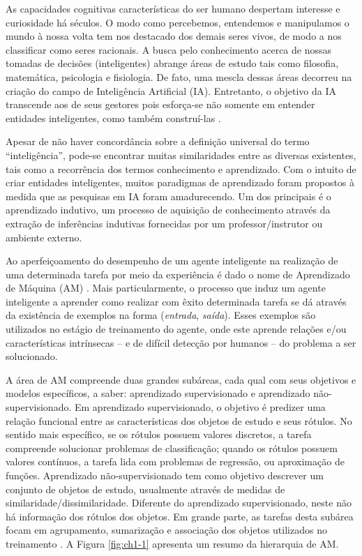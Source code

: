 As capacidades cognitivas características do ser humano despertam interesse e curiosidade há séculos. O modo como percebemos, entendemos e manipulamos o mundo à nossa volta tem nos destacado dos demais seres vivos, de modo a nos classificar como seres racionais. A busca pelo conhecimento acerca de nossas tomadas de decisões (inteligentes) abrange áreas de estudo tais como filosofia, matemática, psicologia e fisiologia. De fato, uma mescla dessas áreas decorreu na criação do campo de Inteligência Artificial (IA). Entretanto, o objetivo da IA transcende aos de seus gestores pois esforça-se não somente em entender entidades inteligentes, como também construí-las \cite{russell2009}.

Apesar de não haver concordância sobre a definição universal do termo ``inteligência'', pode-se encontrar muitas similaridades entre as diversas existentes, tais como a recorrência dos termos conhecimento e aprendizado. Com o intuito de criar entidades inteligentes, muitos paradigmas de aprendizado foram propostos à medida que as pesquisas em IA foram amadurecendo. Um dos principais é o aprendizado indutivo, um processo de aquisição de conhecimento através da extração de inferências indutivas fornecidas por um professor/instrutor ou ambiente externo.

Ao aperfeiçoamento do desempenho de um agente inteligente na realização de uma determinada tarefa por meio da experiência é dado o nome de Aprendizado de Máquina (AM) \cite{mitchell1997}. Mais particularmente, o processo que induz um agente inteligente a aprender como realizar com êxito determinada tarefa se dá através da existência de exemplos na forma (\textit{entrada}, \textit{saída}). Esses exemplos são utilizados no estágio de treinamento do agente, onde este aprende relações e/ou características intrínsecas -- e de difícil detecção por humanos -- do problema a ser solucionado.

A área de AM compreende duas grandes subáreas, cada qual com seus objetivos e modelos específicos, a saber: aprendizado supervisionado e aprendizado não-supervisionado. Em aprendizado supervisionado, o objetivo é predizer uma relação funcional entre as características dos objetos de estudo e seus rótulos. No sentido mais específico, se os rótulos possuem valores discretos, a tarefa compreende solucionar problemas de classificação; quando os rótulos possuem valores contínuos, a tarefa lida com problemas de regressão, ou aproximação de funções. Aprendizado não-supervisionado tem como objetivo descrever um conjunto de objetos de estudo, usualmente através de medidas de similaridade/dissimilaridade. Diferente do aprendizado supervisionado, neste não há informação dos rótulos dos objetos. Em grande parte, as tarefas desta subárea focam em agrupamento, sumarização e associação dos objetos utilizados no treinamento \cite{gama2011}. A Figura \ref{fig:ch1-1} apresenta um resumo da hierarquia de AM.

